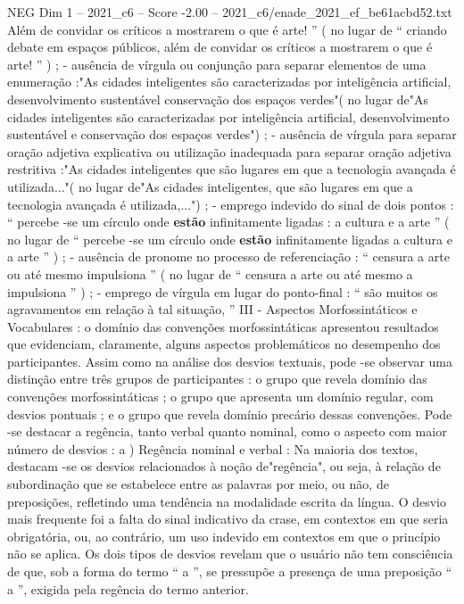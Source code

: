 \begin{textsample}{NEG Dim 1 – 2021\_c6 – Score -2.00 – 2021\_c6/enade\_2021\_ef\_be61acbd52.txt}
Além de convidar os críticos a mostrarem o que é arte! ” ( no lugar de “ criando debate em espaços públicos, além de convidar os críticos a mostrarem o que é arte! ” ) ; - ausência de vírgula ou conjunção para separar elementos de uma enumeração :"As cidades inteligentes são caracterizadas por inteligência artificial, desenvolvimento sustentável conservação dos espaços verdes"( no lugar de"As cidades inteligentes são caracterizadas por inteligência artificial, desenvolvimento sustentável e conservação dos espaços verdes") ; - ausência de vírgula para separar oração adjetiva explicativa ou utilização inadequada para separar oração adjetiva restritiva :"As cidades inteligentes que são lugares em que a tecnologia avançada é utilizada..."( no lugar de"As cidades inteligentes, que são lugares em que a tecnologia avançada é utilizada,...") ; - emprego indevido do sinal de dois pontos : “ percebe -se um círculo onde \textbf{estão} infinitamente ligadas : a cultura e a arte ” ( no lugar de “ percebe -se um círculo onde \textbf{estão} infinitamente ligadas a cultura e a arte ” ) ; - ausência de pronome no processo de referenciação : “ censura a arte ou até mesmo impulsiona ” ( no lugar de “ censura a arte ou até mesmo a impulsiona ” ) ; - emprego de vírgula em lugar do ponto-final : “ são muitos os agravamentos em relação à tal situação, ” III - Aspectos Morfossintáticos e Vocabulares : o domínio das convenções morfossintáticas apresentou resultados que evidenciam, claramente, alguns aspectos problemáticos no desempenho dos participantes.
Assim como na análise dos desvios textuais, pode -se observar uma distinção entre três grupos de participantes : o grupo que revela domínio das convenções morfossintáticas ; o grupo que apresenta um domínio regular, com desvios pontuais ; e o grupo que revela domínio precário dessas convenções.
Pode -se destacar a regência, tanto verbal quanto nominal, como o aspecto com maior número de desvios : a ) Regência nominal e verbal : Na maioria dos textos, destacam -se os desvios relacionados à noção de"regência", ou seja, à relação de subordinação que se estabelece entre as palavras por meio, ou não, de preposições, refletindo uma tendência na modalidade escrita da língua.
O desvio mais frequente foi a falta do sinal indicativo da crase, em contextos em que seria obrigatória, ou, ao contrário, um uso indevido em contextos em que o princípio não se aplica.
Os dois tipos de desvios revelam que o usuário não tem consciência de que, sob a forma do termo “ a ”, se pressupõe a presença de uma preposição “ a ”, exigida pela regência do termo anterior.

\end{textsample}
